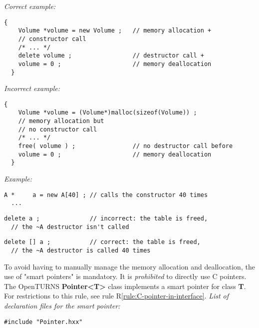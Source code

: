 \emph{Correct example:}
\begin{lstlisting}[frame=TBRL]
  {
    Volume *volume = new Volume ;   // memory allocation +
    // constructor call
    /* ... */
    delete volume ;                 // destructor call +
    volume = 0 ;                    // memory deallocation
  }
\end{lstlisting}
\emph{Incorrect example:}
\begin{lstlisting}[frame=TBRL]
  {
    Volume *volume = (Volume*)malloc(sizeof(Volume)) ;
    // memory allocation but
    // no constructor call
    /* ... */
    free( volume ) ;                // no destructor call before
    volume = 0 ;                    // memory deallocation
  }
\end{lstlisting}

\emph{Example:}
\lstset{language=C++, basicstyle=\normalsize}
\begin{lstlisting}[frame=TRL]
  A *     a = new A[40] ; // calls the constructor 40 times
  ...
\end{lstlisting}
\begin{lstlisting}[frame=RL]
  delete a ;              // incorrect: the table is freed,
  // the ~A destructor isn't called
\end{lstlisting}

\begin{lstlisting}[frame=RLB]
  delete [] a ;           // correct: the table is freed,
  // the ~A destructor is called 40 times
\end{lstlisting}

{To avoid having to manually manage the memory allocation and deallocation, the use of "smart pointers" is mandatory. It is \emph{prohibited} to directly use C pointers. The OpenTURNS {\bf Pointer<T>} class implements a smart pointer for class {\bf T}. For restrictions to this rule, see rule R\ref{rule:C-pointer-in-interface}.
}
\emph{List of declaration files for the smart pointer:}
\lstset{language=C++, basicstyle=\normalsize}
\begin{lstlisting}[frame=TBRL]
  #include "Pointer.hxx"
\end{lstlisting}

